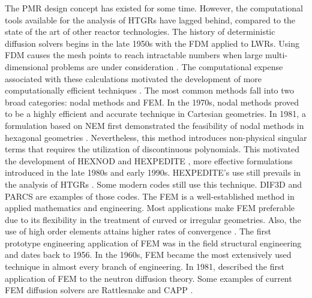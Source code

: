 \documentclass[11pt,letterpaper]{article}
\begin{document}
The \gls{PMR} design concept has existed for some time.
However, the computational tools available for the analysis of \glspl{HTGR} have lagged behind, compared to the state of the art of other reactor technologies.
The history of deterministic diffusion solvers begins in the late 1950s with the \gls{FDM} applied to \glspl{LWR}.
Using \gls{FDM} causes the mesh points to reach intractable numbers when large multi-dimensional problems are under consideration \cite{lewis_finite_1986}.
The computational expense associated with these calculations motivated the development of more computationally efficient techniques \cite{lawrence_progress_1985}.
The most common methods fall into two broad categories: nodal methods and \gls{FEM}.
In the 1970s, nodal methods proved to be a highly efficient and accurate technique in Cartesian geometries.
In 1981, a formulation based on \gls{NEM} first demonstrated the feasibility of nodal methods in hexagonal geometries \cite{duracz_nodal_1981}.
Nevertheless, this method introduces non-physical singular terms that requires the utilization of discontinuous polynomials.
This motivated the development of HEXNOD \cite{wagner_three-dimensional_1989} and HEXPEDITE \cite{fitzpatrick_hexpedite_1992}, more effective formulations introduced in the late 1980s and early 1990s.
HEXPEDITE's use still prevails in the analysis of \glspl{HTGR} \cite{ortensi_deterministic_2010-1}.
Some modern codes still use this technique.
DIF3D \cite{lawrence_dif3d_1983} and PARCS \cite{downar_parcs_2004} are examples of those codes.
The \gls{FEM} is a well-established method in applied mathematics and engineering.
Most applications make \gls{FEM} preferable due to its flexibility in the treatment of curved or irregular geometries.
Also, the use of high order elements attains higher rates of convergence \cite{cavdar_finite_2004}.
The first prototype engineering application of \gls{FEM} was in the field structural engineering and dates back to 1956.
In the 1960s, \gls{FEM} became the most extensively used technique in almost every branch of engineering.
In 1981, \cite{lewis_finite_1981} described the first application of \gls{FEM} to the neutron diffusion theory.
Some examples of current \gls{FEM} diffusion solvers are Rattlesnake \cite{wang_rattlesnake_2019} and CAPP \cite{lee_development_2011}.
\end{document}
